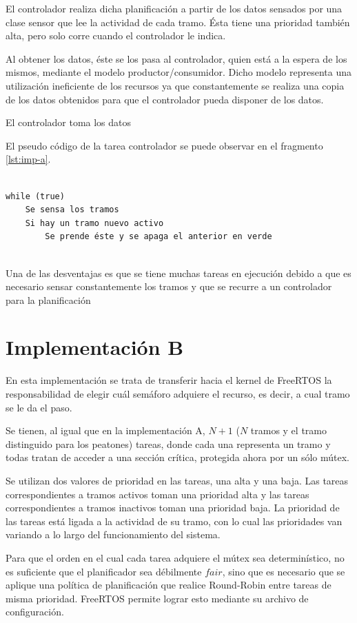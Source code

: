 El controlador realiza dicha planificación a partir de los datos sensados por una clase sensor que lee la actividad de cada tramo.
Ésta tiene una prioridad también alta, pero solo corre cuando el controlador le indica.

Al obtener los datos, éste se los pasa al controlador, quien está a la espera de los mismos, mediante el modelo productor/consumidor.
Dicho modelo representa una utilización ineficiente de los recursos ya que constantemente se realiza una copia de los datos obtenidos para que el controlador pueda disponer de los datos.

El controlador toma los datos 




El pseudo código de la tarea controlador se puede observar en el fragmento \ref{lst:imp-a}.
\begin{lstlisting}[label=lst:imp-a, caption=Pseudocódigo de la tarea controlador.]

while (true)
	Se sensa los tramos
	Si hay un tramo nuevo activo
		Se prende éste y se apaga el anterior en verde
		
\end{lstlisting}

Una de las desventajas es que se tiene muchas tareas en ejecución debido a que es necesario sensar constantemente los tramos y que se recurre a un controlador para la planificación

\section{Implementación B}
En esta implementación se trata de transferir hacia el kernel de FreeRTOS la responsabilidad de elegir cuál semáforo adquiere el recurso, es decir, a cual tramo se le da el paso.

Se tienen, al igual que en la implementación A, $N + 1$ ($N$ tramos y el tramo distinguido para los peatones) tareas, donde cada una representa un tramo y todas tratan de acceder a una sección crítica, protegida ahora por un sólo mútex.

Se utilizan dos valores de prioridad en las tareas, una alta y una baja. Las tareas correspondientes a tramos activos toman una prioridad alta y las tareas correspondientes a tramos inactivos toman una prioridad baja. La prioridad de las tareas está ligada a la actividad de su tramo, con lo cual las prioridades van variando a lo largo del funcionamiento del sistema.

Para que el orden en el cual cada tarea adquiere el mútex sea determinístico, no es suficiente que el planificador sea débilmente $fair$, sino que es necesario que se aplique una política de planificación que realice Round-Robin entre tareas de misma prioridad. FreeRTOS permite lograr esto mediante su archivo de configuración.

